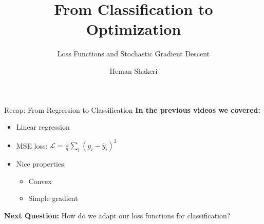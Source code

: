 \documentclass[xcolor=svgnames, 8pt, handout, standalone]{beamer}
\title{From Classification to Optimization}
\subtitle{Loss Functions and Stochastic Gradient Descent}
\author{Heman Shakeri}
\date{}
\newcommand{\1}{\mathbf{1}}
\begin{document}
\begin{frame}
\titlepage
\end{frame}

\begin{frame}{Recap: From Regression to Classification}
\textbf{In the previous videos we covered:}
\begin{itemize}
\item Linear regression
\item MSE loss: $\mathcal{L} = \frac{1}{n}\sum_i (y_i - \hat{y}_i)^2$
\item Nice properties:
    \begin{itemize}
    \item Convex
    \item Simple gradient
    \end{itemize}
\end{itemize}
\begin{tcolorbox}[colback=lightyellow, colframe=energyorange, boxrule=1pt]
\centering
\textbf{Next Question:} How do we adapt our loss functions for classification?
\end{tcolorbox}
\end{frame}


\end{document}
